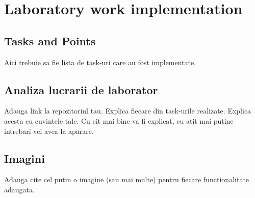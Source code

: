 \section{Laboratory work implementation}

\subsection{Tasks and Points}

Aici trebuie sa fie lista de task-uri care au fost implementate.

\subsection{Analiza lucrarii de laborator}

Adauga link la repozitoriul tau.
Explica fiecare din task-urile realizate. Explica acesta cu cuvintele tale. Cu cit mai bine va fi explicat,
cu atit mai putine intrebari vei avea la aparare.

\subsection{Imagini}

Adauga cite cel putin o imagine (sau mai multe) pentru fiecare functionalitate adaugata.

\clearpage